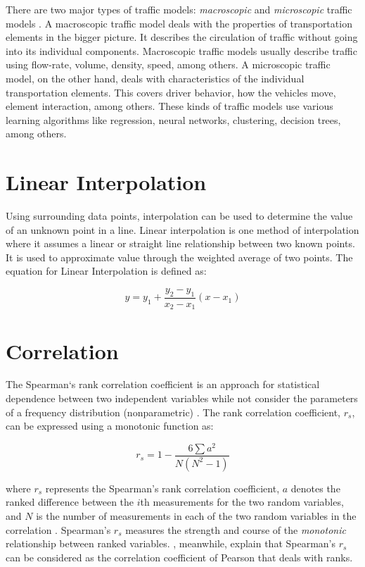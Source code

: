 There are two major types of traffic models: \textit{macroscopic} and \textit{microscopic} traffic models . A macroscopic traffic model deals with the properties of transportation elements in the bigger picture. It describes the circulation of traffic without going into its individual components. Macroscopic traffic models usually describe traffic using flow-rate, volume, density, speed, among others. A microscopic traffic model, on the other hand, deals with characteristics of the individual transportation elements. This covers driver behavior, how the vehicles move, element interaction, among others. These kinds of traffic models use various learning algorithms like regression, neural networks, clustering, decision trees, among others. 




\section{Linear Interpolation}
Using surrounding data points, interpolation can be used to determine the value of an unknown point in a line. Linear interpolation is one method of interpolation where it assumes a linear or straight line relationship between two known points. It is used to approximate value through the weighted average of two points. The equation for Linear Interpolation is defined as:

\begin {equation}
y = y_1 + \frac{y_2 - y_1}{x_2 - x_1} (x - x_1)
\end{equation}



\section{Correlation}
The Spearman`s rank correlation coefficient is an approach for statistical dependence between two independent variables while not consider the parameters of a frequency distribution (nonparametric) . The rank correlation coefficient, $r_s$, can be expressed using a monotonic function as: 

\begin {equation}
r_s = 1 - \frac{6 \sum a^2}{N(N^2 - 1)}
\end{equation}

\noindent where $r_s$  represents the Spearman’s rank correlation coefficient, $a$ denotes the ranked difference between the $i$th measurements for the two random variables, and $N$ is the number of measurements in each of the two random variables in the correlation . Spearman’s $r_s$ measures the strength and course of the \textit{monotonic} relationship between ranked variables. , meanwhile, explain that Spearman’s $r_s$ can be considered as the correlation coefficient of Pearson that deals with ranks.  

